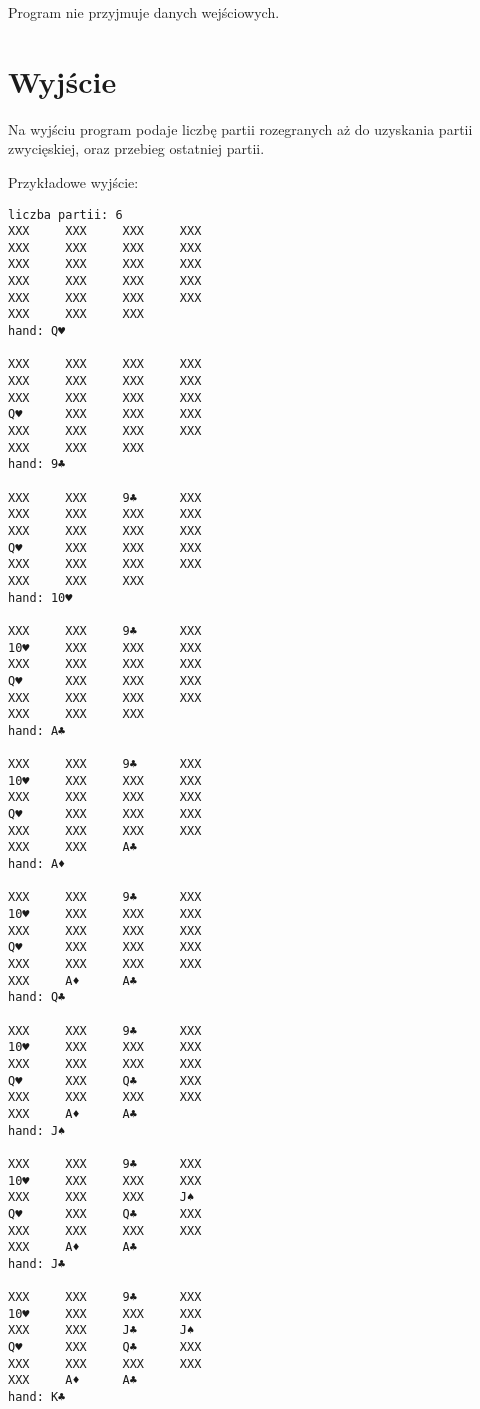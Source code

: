 \documentclass{article}
\begin{document}
Program nie przyjmuje danych wejściowych.

\section{Wyjście}

Na wyjściu program podaje liczbę partii rozegranych aż do uzyskania partii zwycięskiej, oraz przebieg ostatniej partii.

Przykładowe wyjście:

\setlength{\columnsep}{1.2cm}
\setlength{\columnseprule}{1pt}
\def\columnseprulecolor{\color{black}}
\begin{multicols}{2}
\begin{verbatim}
liczba partii: 6
XXX     XXX     XXX     XXX
XXX     XXX     XXX     XXX
XXX     XXX     XXX     XXX
XXX     XXX     XXX     XXX
XXX     XXX     XXX     XXX
XXX     XXX     XXX
hand: Q♥

XXX     XXX     XXX     XXX
XXX     XXX     XXX     XXX
XXX     XXX     XXX     XXX
Q♥      XXX     XXX     XXX
XXX     XXX     XXX     XXX
XXX     XXX     XXX
hand: 9♣

XXX     XXX     9♣      XXX
XXX     XXX     XXX     XXX
XXX     XXX     XXX     XXX
Q♥      XXX     XXX     XXX
XXX     XXX     XXX     XXX
XXX     XXX     XXX
hand: 10♥

XXX     XXX     9♣      XXX
10♥     XXX     XXX     XXX
XXX     XXX     XXX     XXX
Q♥      XXX     XXX     XXX
XXX     XXX     XXX     XXX
XXX     XXX     XXX
hand: A♣

XXX     XXX     9♣      XXX
10♥     XXX     XXX     XXX
XXX     XXX     XXX     XXX
Q♥      XXX     XXX     XXX
XXX     XXX     XXX     XXX
XXX     XXX     A♣
hand: A♦

XXX     XXX     9♣      XXX
10♥     XXX     XXX     XXX
XXX     XXX     XXX     XXX
Q♥      XXX     XXX     XXX
XXX     XXX     XXX     XXX
XXX     A♦      A♣
hand: Q♣

XXX     XXX     9♣      XXX
10♥     XXX     XXX     XXX
XXX     XXX     XXX     XXX
Q♥      XXX     Q♣      XXX
XXX     XXX     XXX     XXX
XXX     A♦      A♣
hand: J♠

XXX     XXX     9♣      XXX
10♥     XXX     XXX     XXX
XXX     XXX     XXX     J♠
Q♥      XXX     Q♣      XXX
XXX     XXX     XXX     XXX
XXX     A♦      A♣
hand: J♣

XXX     XXX     9♣      XXX
10♥     XXX     XXX     XXX
XXX     XXX     J♣      J♠
Q♥      XXX     Q♣      XXX
XXX     XXX     XXX     XXX
XXX     A♦      A♣
hand: K♣


\end{verbatim}
\end{multicols}
\end{document}
